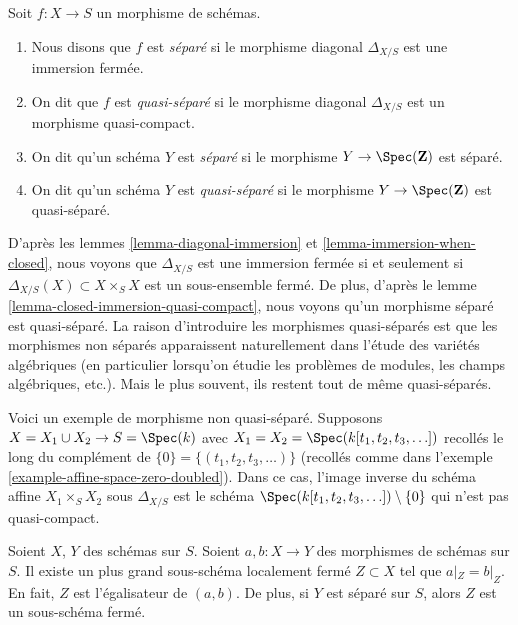 \begin{definition}
\label{definition-separated}
Soit $f : X \to S$ un morphisme de schémas.
\begin{enumerate}
\item Nous disons que $f$ est {\it séparé} si le morphisme diagonal $\Delta_{X/S}$
est une immersion
fermée. \item On dit que $f$ est {\it quasi-séparé} si le morphisme
diagonal $\Delta_{X/S}$ est un morphisme quasi-compact.
\item On dit qu'un schéma $Y$ est {\it séparé} si le
morphisme $Y \to \Spec(\mathbf{Z})$ est séparé.
\item On dit qu'un schéma $Y$ est {\it quasi-séparé} si le morphisme
$Y \to \Spec(\mathbf{Z})$ est quasi-séparé.
\end{enumerate}
\end{definition}

\noindent
D'après les lemmes \ref{lemma-diagonal-immersion} et \ref{lemma-immersion-when-closed}, nous
voyons que $\Delta_{X/S}$ est une immersion fermée si et seulement si
$\Delta_{X/S}(X) \subset X \times_S X$ est un sous-ensemble fermé. De plus, d'après le
lemme \ref{lemma-closed-immersion-quasi-compact}, nous voyons qu'un morphisme
séparé est quasi-séparé. La raison d'introduire les morphismes quasi-séparés est
que les morphismes non séparés apparaissent naturellement dans l'étude des variétés
algébriques (en particulier lorsqu'on étudie les problèmes de modules, les champs
algébriques, etc.). Mais le plus souvent, ils restent tout de même quasi-séparés.

\begin{example}
\label{example-not-quasi-separated}
Voici un exemple de morphisme non quasi-séparé. Supposons
$X = X_1 \cup X_2 \to S = \Spec(k)$ avec $X_1
= X_2 = \Spec(k[t_1, t_2, t_3, \ldots])$ recollés
le long du complément de $\{0\} = \{(t_1, t_2, t_3, \ldots)\}$
(recollés comme dans l'exemple \ref{example-affine-space-zero-doubled}).
Dans ce cas, l'image inverse du schéma affine
$X_1 \times_S X_2$ sous $\Delta_{X/S}$ est le schéma
$\Spec(k[t_1, t_2, t_3, \ldots]) \setminus \{0\}$
qui n'est pas quasi-compact.
\end{example}

\begin{lemma}
\label{lemma-where-are-they-equal}
Soient $X$, $Y$ des schémas sur $S$.
Soient $a, b : X \to Y$ des morphismes de schémas sur
$S$. Il existe un plus grand sous-schéma localement
fermé $Z \subset X$ tel que $a|_Z = b|_Z$. En fait, $Z$
est l'égalisateur de $(a, b)$. De plus, si $Y$ est séparé
sur $S$, alors $Z$ est un sous-schéma fermé.
\end{lemma}

